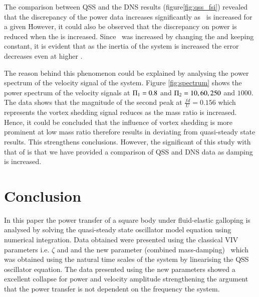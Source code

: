 The comparison between QSS and the DNS results (figure\ref{fig:qss_fsi}) revealed that
the discrepancy of the power data  increases significantly as \massdamp \ is increased for a given \massstiff \. However, it could also be observed that the discrepancy on power is reduced when the \massstiff is increased. Since \massstiff \ was increased by changing the \mstar and keeping \ustar constant, it is evident that as the inertia of the system is increased the error decreases even at higher \massdamp.

\begin{center}
	
\end{center}


The reason behind this phenomenon could be explained by analysing the power spectrum of the velocity signal of the system. Figure \ref{fig:spectrum} shows the power spectrum of the velocity signals at $\Pi_1=0.8$ and $\Pi_2= 10, 60, 250$ and $1000$. The data shows that the  magnitude of the second peak at $\frac{fd}{U}=0.156$ which represents the vortex shedding signal reduces as the mass ratio is increased. Hence, it could be concluded that the influence of vortex shedding is more prominent at low mass ratio therefore results in deviating from quasi-steady state results. This strengthens \cite{Joly2012} conclusions. However, the significant of this study with that of \cite{Joly2012} is that we have provided a comparison of QSS and DNS data as damping is increased. 






 
 
 
 
 
 \section{Conclusion}
  \label{sec:conc}
  In this paper the power transfer of a square body under fluid-elastic galloping is analysed by solving the quasi-steady state oscillator model equation using numerical  integration. Data obtained were presented using the classical VIV parameters i.e. $\zeta$ and \ustar and the new parameter (combined mass-damping) \massdamp \ which was obtained using the natural time scales of the system by linearising the QSS oscillator equation. The data presented using the new parameters showed a excellent collapse for power and velocity amplitude strengthening the argument that the power transfer is not dependent on the frequency the system.   
 
 
 
 
 
 
 
 
 
 
 
 
 
 
 
 
 
 
 
 
 
 
 
 
 
 







